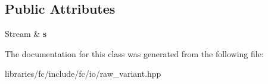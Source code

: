 \subsection*{Public Attributes}
\begin{DoxyCompactItemize}
\item 
\mbox{\label{classfc_1_1raw_1_1variant__packer_a60302c2f4cc143a5031c00c6ac024391}} 
Stream \& {\bfseries s}
\end{DoxyCompactItemize}


The documentation for this class was generated from the following file\+:\begin{DoxyCompactItemize}
\item 
libraries/fc/include/fc/io/raw\+\_\+variant.\+hpp\end{DoxyCompactItemize}
